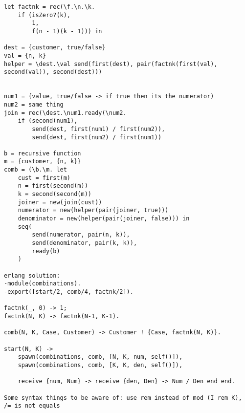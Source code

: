 \documentclass{article}
\begin{document}
    \begin{verbatim}
let factnk = rec(\f.\n.\k.
    if (isZero?(k),
        1,
        f(n - 1)(k - 1))) in

dest = {customer, true/false}
val = {n, k}
helper = \dest.\val send(first(dest), pair(factnk(first(val), second(val)), second(dest)))


num1 = {value, true/false -> if true then its the numerator)
num2 = same thing
join = rec(\dest.\num1.ready(\num2.
    if (second(num1),
        send(dest, first(num1) / first(num2)),
        send(dest, first(num2) / first(num1))

b = recursive function
m = {customer, {n, k}}
comb = (\b.\m. let
    cust = first(m)
    n = first(second(m))
    k = second(second(m))
    joiner = new(join(cust))
    numerator = new(helper(pair(joiner, true)))
    denominator = new(helper(pair(joiner, false))) in
    seq(
        send(numerator, pair(n, k)),
        send(denominator, pair(k, k)),
        ready(b)
    )

erlang solution:
-module(combinations).
-export([start/2, comb/4, factnk/2]).

factnk(_, 0) -> 1;
factnk(N, K) -> factnk(N-1, K-1).

comb(N, K, Case, Customer) -> Customer ! {Case, factnk(N, K)}.

start(N, K) ->
    spawn(combinations, comb, [N, K, num, self()]),
    spawn(combinations, comb, [K, K, den, self()]),

    receive {num, Num} -> receive {den, Den} -> Num / Den end end.

Some syntax things to be aware of: use rem instead of mod (I rem K), /= is not equals
    \end{verbatim}
\end{document}
